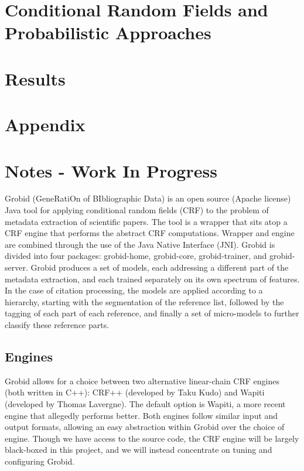 \documentclass[11pt, oneside]{scrartcl}   	%
\begin{document}
\section{Conditional Random Fields and Probabilistic Approaches}

\section{Results}

\section{Appendix}

\section{Notes - Work In Progress}

Grobid (GeneRatiOn of BIbliographic Data) is an open source (Apache license) Java tool for applying conditional random fields (CRF) to the problem of metadata extraction of scientific papers. The tool is a wrapper that sits atop a CRF engine that performs the abstract CRF computations. Wrapper and engine are combined through the use of the Java Native Interface (JNI). Grobid is divided into four packages: grobid-home, grobid-core, grobid-trainer, and grobid-server. Grobid produces a set of models, each addressing a different part of the metadata extraction, and each trained separately on its own spectrum of features. In the case of citation processing, the models are applied according to a hierarchy, starting with the segmentation of the reference list, followed by the tagging of each part of each reference, and finally a set of micro-models to further classify these reference parts.

\subsection{Engines}

Grobid allows for a choice between two alternative linear-chain CRF engines (both written in C++): CRF++ (developed by Taku Kudo) and Wapiti (developed by Thomas Lavergne). The default option is Wapiti, a more recent engine that allegedly performs better. Both engines follow similar input and output formats, allowing an easy abstraction within Grobid over the choice of engine. Though we have access to the source code, the CRF engine will be largely black-boxed in this project, and we will instead concentrate on tuning and configuring Grobid.
\end{document}
